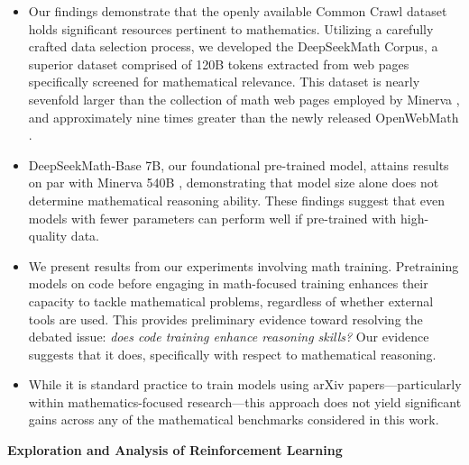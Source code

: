 \begin{itemize}[topsep=0pt]
    \item Our findings demonstrate that the openly available Common Crawl dataset holds significant resources pertinent to mathematics. Utilizing a carefully crafted data selection process, we developed the DeepSeekMath Corpus, a superior dataset comprised of 120B tokens extracted from web pages specifically screened for mathematical relevance. This dataset is nearly sevenfold larger than the collection of math web pages employed by Minerva \citep{minerva}, and approximately nine times greater than the newly released OpenWebMath \citep{openwebmath}.

\item DeepSeekMath-Base 7B, our foundational pre-trained model, attains results on par with Minerva 540B \citep{minerva}, demonstrating that model size alone does not determine mathematical reasoning ability. These findings suggest that even models with fewer parameters can perform well if pre-trained with high-quality data.

\item We present results from our experiments involving math training. Pretraining models on code before engaging in math-focused training enhances their capacity to tackle mathematical problems, regardless of whether external tools are used. This provides preliminary evidence toward resolving the debated issue: \textit{does code training enhance reasoning skills?} Our evidence suggests that it does, specifically with respect to mathematical reasoning.

\item While it is standard practice to train models using arXiv papers—particularly within mathematics-focused research—this approach does not yield significant gains across any of the mathematical benchmarks considered in this work.
\end{itemize}

\textbf{Exploration and Analysis of Reinforcement Learning}

